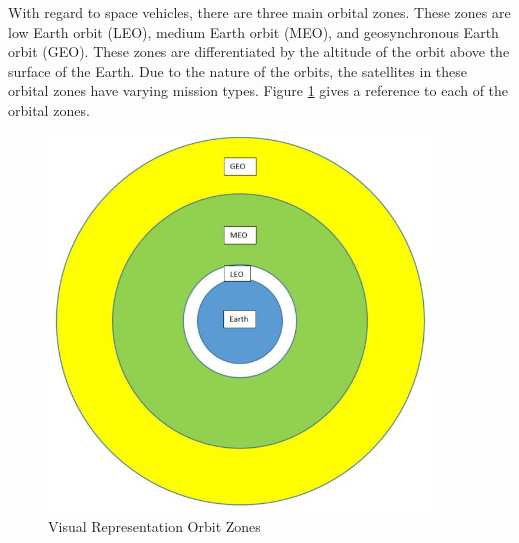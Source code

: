 \documentclass[12pt]{report}
\begin{document}
With regard to space vehicles, there are three main orbital zones. These zones are low Earth orbit (LEO), medium Earth orbit (MEO), and geosynchronous Earth orbit (GEO). These zones are differentiated by the altitude of the orbit above the surface of the Earth. Due to the nature of the orbits, the satellites in these orbital zones have varying mission types. Figure \ref{fig:satorbzone} gives a reference to each of the orbital zones. 

\begin{figure}
    \centering
    \includegraphics[width=4in]{satellite_orbit_zones.JPG}
    \caption{Visual Representation Orbit Zones}
    \label{fig:satorbzone}

\end{figure}
\end{document}
